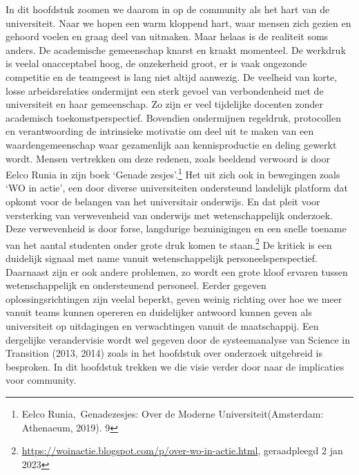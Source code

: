 \documentclass[empirical, authordate, ]{new-jote-article}
\begin{document}
	In dit hoofdstuk zoomen we daarom in op de community als het hart van de universiteit. Naar we hopen een warm kloppend hart, waar mensen zich gezien en gehoord voelen en graag deel van uitmaken. Maar helaas is de realiteit soms anders. De academische gemeenschap knarst en kraakt momenteel. De werkdruk is veelal onacceptabel hoog, de onzekerheid groot, er is vaak ongezonde competitie en de teamgeest is lang niet altijd aanwezig. De veelheid van korte, losse arbeidsrelaties ondermijnt een sterk gevoel van verbondenheid met de universiteit en haar gemeenschap. Zo zijn er veel tijdelijke docenten zonder academisch toekomstperspectief. Bovendien ondermijnen regeldruk, protocollen en verantwoording de intrinsieke motivatie om deel uit te maken van een waardengemeenschap waar gezamenlijk aan kennisproductie en deling gewerkt wordt. Mensen vertrekken om deze redenen, zoals beeldend verwoord is door Eelco Runia in zijn boek ‘Genade zesjes'.\footnote{Eelco Runia, Genadezesjes: Over de Moderne Universiteit(Amsterdam: Athenaeum, 2019). 9} Het uit zich ook in bewegingen zoals ‘WO in actie', een door diverse universiteiten ondersteund landelijk platform dat opkomt voor de belangen van het universitair onderwijs. En dat pleit voor versterking van verwevenheid van onderwijs met wetenschappelijk onderzoek. Deze verwevenheid is door forse, langdurige bezuinigingen en een snelle toename van het aantal studenten onder grote druk komen te staan.\footnote{\href{https://woinactie.blogspot.com/p/over-wo-in-actie.html}{https://woinactie.blogspot.com/p/over-wo-in-actie.html}, geraadpleegd 2 jan 2023} De kritiek is een duidelijk signaal met name vanuit wetenschappelijk personeelsperspectief. Daarnaast zijn er ook andere problemen, zo wordt een grote kloof ervaren tussen wetenschappelijk en ondersteunend personeel. Eerder gegeven oplossingsrichtingen zijn veelal beperkt, geven weinig richting over hoe we meer vanuit teams kunnen opereren en duidelijker antwoord kunnen geven als universiteit op uitdagingen en verwachtingen vanuit de maatschappij. Een dergelijke verandervisie wordt wel gegeven door de systeemanalyse van Science in Transition (2013, 2014) zoals in het hoofdstuk over onderzoek uitgebreid is besproken. In dit hoofdstuk trekken we die visie verder door naar de implicaties voor community.
\end{document}
